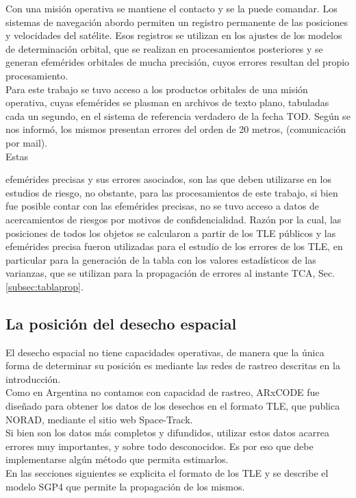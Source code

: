 Con una misi\'on operativa se mantiene el contacto y se la puede comandar. Los sistemas de navegaci\'on abordo permiten un registro permanente de las posiciones y velocidades del sat\'elite. Esos registros se utilizan en los ajustes de los modelos de determinaci\'on orbital, que se realizan en procesamientos posteriores y se generan efem\'erides orbitales de mucha precisi\'on, cuyos errores resultan del propio procesamiento.\\
Para este trabajo se tuvo acceso a los productos orbitales de una misi\'on operativa, cuyas efem\'erides se plasman en archivos de texto plano, tabuladas cada un segundo, en el sistema de referencia verdadero de la fecha \ac{TOD}. Seg\'un se nos inform\'o, los mismos presentan errores del orden de  20 metros, (comunicaci\'on por mail).\\
Estas {efem\'erides precisas y sus errores asociados, son las que deben utilizarse en los estudios de riesgo, no obstante, para las procesamientos de este trabajo, si bien fue posible contar con las efem\'erides precisas, no se tuvo acceso a datos de acercamientos de riesgos por motivos de confidencialidad. Raz\'on por la cual, las posiciones de todos los objetos se calcularon a partir de los TLE p\'ublicos y las efem\'erides precisa fueron utilizadas para el estudio de los errores de los TLE, en particular para la generaci\'on de la tabla con los valores estad\'isticos de las varianzas, que se utilizan para la propagaci\'on de errores al instante TCA, Sec. \ref{subsec:tablaprop}. \\

\subsection{La posici\'on del desecho espacial}
El desecho espacial no tiene capacidades operativas, de manera que la \'unica forma de determinar su posici\'on es mediante las redes de rastreo descritas en la introducci\'on.\\
Como en Argentina no contamos con capacidad de rastreo, ARxCODE fue dise\~nado para obtener los datos de los desechos en el formato TLE, que publica NORAD, mediante el sitio web Space-Track.\\
Si bien son los datos m\'as completos y difundidos, utilizar estos datos acarrea errores muy importantes, y sobre todo desconocidos. Es por eso que debe implementarse alg\'un m\'etodo que permita estimarlos.\\

En las secciones siguientes se explicita el formato de los TLE y se describe el modelo SGP4 que permite la propagaci\'on de los mismos.\\

}
